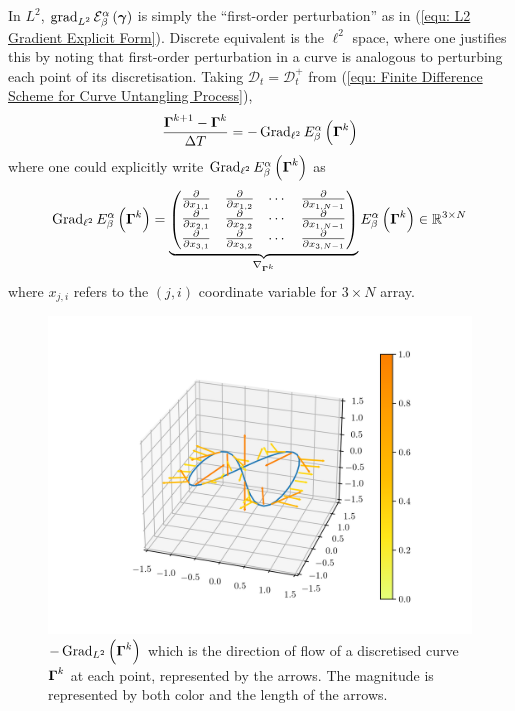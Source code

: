 \documentclass[../dissertation.tex]{subfiles}
\begin{document}
In $L^2$, $\operatorname{grad}_{L^2} \mathcal{E}_{\beta}^{\alpha} \left( \boldsymbol{\gamma} \right)$ is simply the ``first-order perturbation'' as in (\ref{equ: L2 Gradient Explicit Form}).
Discrete equivalent is the $\ell^2$ space,
where one justifies this by noting that first-order perturbation in a curve is analogous to perturbing each point of its discretisation.
Taking $\mathcal{D}_t = \mathcal{D}_t^+$ from (\ref{equ: Finite Difference Scheme for Curve Untangling Process}),
\begin{equation}
    \frac{\boldsymbol{\Gamma}^{k+1} - \boldsymbol{\Gamma}^k}{\Delta T} = - \operatorname{Grad}_{\ell^2} E_{\beta}^{\alpha} \left( \boldsymbol{\Gamma}^k \right)
    \label{equ: L2 Explicit Euler}
\end{equation}
where one could explicitly write $\operatorname{Grad}_{\ell^2} E_{\beta}^\alpha \left( \boldsymbol{\Gamma}^k \right)$ as
\begin{equation}
    \operatorname{Grad}_{\ell^2} E_{\beta}^\alpha \left( \boldsymbol{\Gamma}^k \right)
    =
    \underbrace{
        \begin{pmatrix}
            \frac{\partial}{\partial x_{1,1}} & \frac{\partial}{\partial x_{1,2}} & \cdots & \frac{\partial}{\partial x_{1,N-1}} \\
            \frac{\partial}{\partial x_{2,1}} & \frac{\partial}{\partial x_{2,2}} & \cdots & \frac{\partial}{\partial x_{1,N-1}} \\
            \frac{\partial}{\partial x_{3,1}} & \frac{\partial}{\partial x_{3,2}} & \cdots & \frac{\partial}{\partial x_{3,N-1}}
        \end{pmatrix}
    }_{\nabla_{\boldsymbol{\Gamma}^k}}
    E_{\beta}^{\alpha} \left( \boldsymbol{\Gamma}^k \right)
    \in \mathbb{R}^{3 \times N}
    \label{equ: Gradient in l2}
\end{equation}
where $x_{j,i}$ refers to the $\left( j,i \right)$ coordinate variable for $3 \times N$ array.
\begin{figure}[tbp]
    \centering
    \includegraphics[width=\textwidth]{sections/unknottingCurveImgs/L2Derivative}
    \caption{$-\operatorname{Grad}_{L^2} \left( \boldsymbol{\Gamma}^k \right)$ which is the direction of flow of a discretised curve $\boldsymbol{\Gamma}^k$ at each point, represented by the arrows. The magnitude is represented by both color and the length of the arrows.}
    \label{fig: L2Derivative}
\end{figure}
\end{document}
